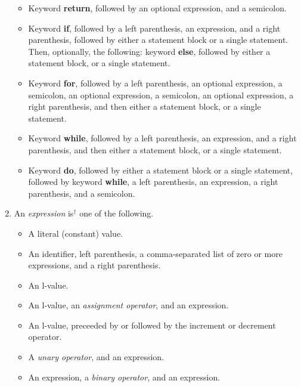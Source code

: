 \documentclass{article}
\newcommand{\iseasier}{is$^\dagger$ }
\begin{document}
\begin{enumerate}
\begin{itemize}
    \item Keyword {\bf return}, followed by an optional expression,
    and a semicolon.

    \item Keyword {\bf if}, followed by a left parenthesis,
    an expression, and a right parenthesis,
    followed by either a statement block or a single statement.
    Then, optionally, the following:
    keyword {\bf else}, followed by either a statement block,
    or a single statement.

    \item Keyword {\bf for}, followed by a left parenthesis,
      an optional expression, a semicolon, an optional expression,
      a semicolon, an optional expression, a right parenthesis,
      and then either a statement block,
      or a single statement.

    \item Keyword {\bf while}, followed by a left parenthesis,
      an expression, and a right parenthesis,
      and then either a statement block, or a single statement.

    \item Keyword {\bf do}, followed by either a statement block
    or a single statement,
    followed by keyword {\bf while}, a left parenthesis, an expression,
    a right parenthesis, and a semicolon.

  \end{itemize}

\item
  An \emph{expression} \iseasier one of the following.
  \begin{itemize}
    \item A literal (constant) value.
    \item An identifier, left parenthesis,
    a comma-separated list of zero or more expressions,
    and a right parenthesis.

    \item An l-value.

    \item An l-value, an \emph{assignment operator}, and an expression.

    \item An l-value, preceeded by or followed by the
    increment or decrement operator.

    \item A \emph{unary operator}, and an expression.

    \item An expression, a \emph{binary operator}, and an expression.


\end{itemize}
\end{enumerate}
\end{document}
